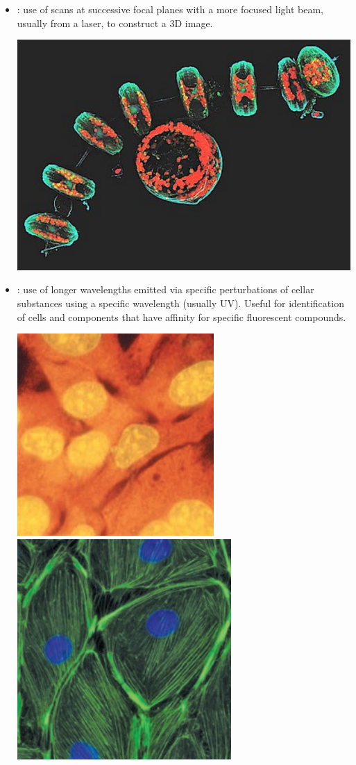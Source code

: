 \begin{itemize}
\begin{center}
  \end{center}
  \item {}: use of scans at successive focal planes with a more focused light beam, usually from a laser, to construct a 3D image.
  \begin{center}
    \includegraphics[scale=0.50]{images/week-1-1c.png}
  \end{center}
  \item {}: use of longer wavelengths emitted via specific perturbations of cellar substances using a specific wavelength (usually UV). Useful for identification of cells and components that have affinity for specific fluorescent compounds. 
  \begin{center}
    \includegraphics[scale=0.60]{images/week-1-1d.png}
    \includegraphics[scale=0.55]{images/week-1-1e.png}

\end{center}
\end{itemize}
